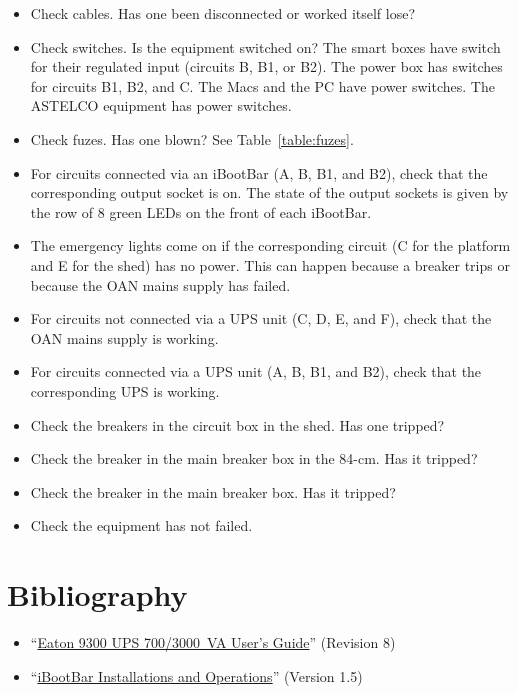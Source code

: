\begin{itemize}
\item Check cables. Has one been disconnected or worked itself lose?
\item Check switches. Is the equipment switched on? The smart boxes have switch for their regulated input (circuits B, B1, or B2). The power box has switches for circuits B1, B2, and C. The Macs and the PC have power switches. The ASTELCO equipment has power switches.
\item Check fuzes. Has one blown? See Table~\ref{table:fuzes}.
\item For circuits connected via an iBootBar (A, B, B1, and B2), check that the corresponding output socket is on. The state of the output sockets is given by the row of 8 green LEDs on the front of each iBootBar.
\item The emergency lights come on if the corresponding circuit (C for the platform and E for the shed) has no power. This can happen because a breaker trips or because the OAN mains supply has failed.
\item For circuits not connected via a UPS unit (C, D, E, and F), check that the OAN mains supply is working.
\item For circuits connected via a UPS unit (A, B, B1, and B2), check that the corresponding UPS is working.
\item Check the breakers in the circuit box in the shed. Has one tripped?
\ifcoatlioan
\item Check the breaker in the main breaker box in the 84-cm. Has it tripped?
\fi
\ifddotioan
\item Check the breaker in the main breaker box. Has it tripped?
\fi
\item Check the equipment has not failed.
\end{itemize}

\section{Bibliography}

\begin{flushleft}
\begin{itemize}
\item “\href{bibliography/eaton-9130-ups.pdf}{Eaton 9300 UPS 700/3000~VA User's Guide}” (Revision 8)
\item “\href{bibliography/dataprobe-ibootbar.pdf}{iBootBar Installations and Operations}” (Version 1.5)
\end{itemize}
\end{flushleft}

